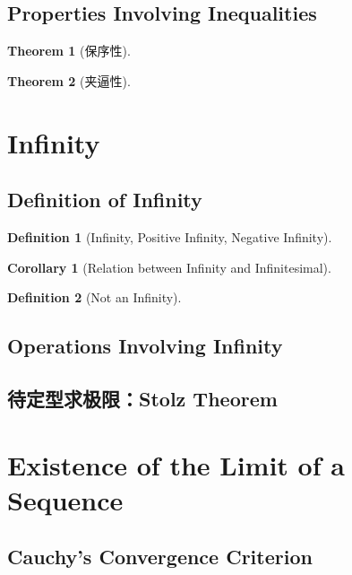 \documentclass[onecolumn]{ctexart}
\newtheorem{definition}{Definition}
\newtheorem{theorem}{Theorem}
\newtheorem{corollary}{Corollary}
\begin{document}
\subsection{Properties Involving Inequalities}

\begin{theorem}[保序性]
  
\end{theorem}

\begin{theorem}[夹逼性]
  
\end{theorem}

\section{Infinity}

\subsection{Definition of Infinity}

\begin{definition}[Infinity, Positive Infinity, Negative Infinity]
  
\end{definition}

\begin{corollary}[Relation between Infinity and Infinitesimal]
  
\end{corollary}

\begin{definition}[Not an Infinity]
  
\end{definition}

\subsection{Operations Involving Infinity}

\subsection{待定型求极限：Stolz Theorem}

\section{Existence of the Limit of a Sequence}

\subsection{Cauchy's Convergence Criterion}
\end{document}

